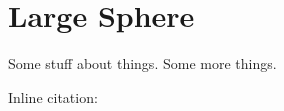 \chapter{Large Sphere}
\label{LargeSphereChapter}

Some stuff about things.\cite{example-citation} Some more things. 

Inline citation: 

\blindtext
